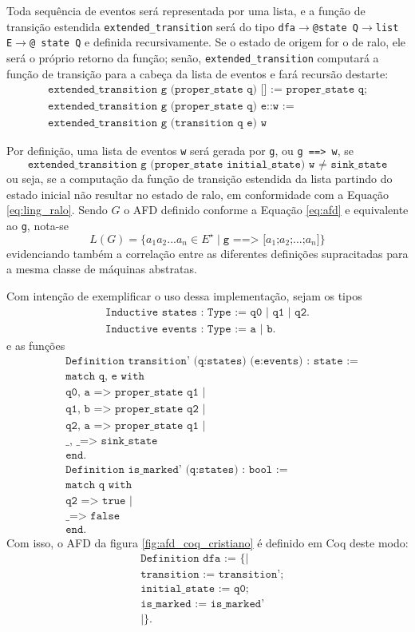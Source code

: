 Toda sequência de eventos será representada por uma lista, e a função de transição estendida \texttt{extended\_transition} será do tipo \texttt{dfa$\to$@state Q$\to$list E$\to$@ state Q} e definida recursivamente. Se o estado de origem for o de ralo, ele será o próprio retorno da função; senão, \texttt{extended\_transition} computará a função de transição para a cabeça da lista de eventos e fará recursão destarte: \begin{gather*}
\texttt{extended\_transition g (proper\_state q) [] := proper\_state q;}\\\texttt{extended\_transition g (proper\_state q) e::w :=}\\\texttt{extended\_transition g (transition q e) w}\end{gather*}

Por definição, uma lista de eventos \texttt{w} será gerada por \texttt{g}, ou \texttt{g ==> w}, se $$\texttt{extended\_transition g (proper\_state initial\_state) w $\neq$ sink\_state}$$ ou seja, se a computação da função de transição estendida da lista partindo do estado inicial não resultar no estado de ralo, em conformidade com a Equação \ref{eq:ling_ralo}. Sendo $G$ o AFD definido conforme a Equação \ref{eq:afd} e equivalente ao \texttt{g}, nota-se $$L(G) = \{ a_1a_2...a_n \in E^\star \mid \texttt{g ==> [$a_1$;$a_2$;$...$;$a_n$]} \}$$ evidenciando também a correlação entre as diferentes definições supracitadas para a mesma classe de máquinas abstratas.

Com intenção de exemplificar o uso dessa implementação, sejam os tipos \begin{gather*}\texttt{Inductive states : Type := q0 | q1 | q2.} \\ \texttt{Inductive events : Type := a | b.}\end{gather*} e as funções \begin{align*}&\texttt{Definition transition' (q:states) (e:events) : state :=}\\
&\texttt{match q, e with}\\
&\texttt{q0, a => proper\_state q1 |}\\
&\texttt{q1, b => proper\_state q2 |}\\
&\texttt{q2, a => proper\_state q1 |}\\
&\texttt{\_, \_ => sink\_state}\\
&\texttt{end.}\\
&\texttt{Definition is\_marked' (q:states) : bool :=}\\
&\texttt{match q with}\\
&\texttt{q2 => true |}\\
&\texttt{\_ => false}\\
&\texttt{end.}
\end{align*} Com isso, o AFD da figura \ref{fig:afd_coq_cristiano} é definido em Coq deste modo: \begin{align*}&\texttt{Definition dfa := \{|}\\
&\texttt{transition := transition';}\\&\texttt{initial\_state := q0;}\\&\texttt{is\_marked := is\_marked'}\\&\texttt{|\}.}\end{align*}

